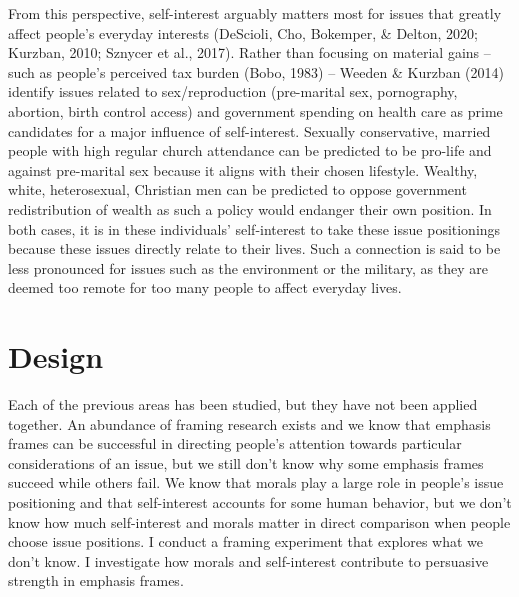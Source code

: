 \documentclass[12pt,econ]{sources/authesis}
\begin{document}
From this perspective, self-interest arguably matters most for issues that greatly affect people's everyday interests (DeScioli, Cho, Bokemper, \& Delton, 2020; Kurzban, 2010; Sznycer et al., 2017). Rather than focusing on material gains -- such as people's perceived tax burden (Bobo, 1983) -- Weeden \& Kurzban (2014) identify issues related to sex/reproduction (pre-marital sex, pornography, abortion, birth control access) and government spending on health care as prime candidates for a major influence of self-interest. Sexually conservative, married people with high regular church attendance can be predicted to be pro-life and against pre-marital sex because it aligns with their chosen lifestyle. Wealthy, white, heterosexual, Christian men can be predicted to oppose government redistribution of wealth as such a policy would endanger their own position. In both cases, it is in these individuals' self-interest to take these issue positionings because these issues directly relate to their lives. Such a connection is said to be less pronounced for issues such as the environment or the military, as they are deemed too remote for too many people to affect everyday lives.

\hypertarget{framing-design}{%
\section{Design}\label{framing-design}}

Each of the previous areas has been studied, but they have not been applied together. An abundance of framing research exists and we know that emphasis frames can be successful in directing people's attention towards particular considerations of an issue, but we still don't know why some emphasis frames succeed while others fail. We know that morals play a large role in people's issue positioning and that self-interest accounts for some human behavior, but we don't know how much self-interest and morals matter in direct comparison when people choose issue positions. I conduct a framing experiment that explores what we don't know. I investigate how morals and self-interest contribute to persuasive strength in emphasis frames.
\end{document}
